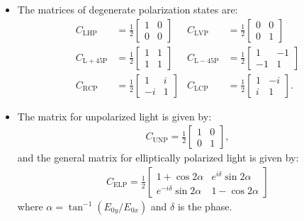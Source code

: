\documentclass[10pt]{article}
\begin{document}
\begin{itemize}
		\item The matrices of degenerate polarization states are:
		\begin{align*}
			C_{\mathrm{LHP}} &= \frac{1}{2} \begin{bmatrix}
				1 & 0 \\ 0 & 0
			\end{bmatrix} &
			C_{\mathrm{LVP}} &= \frac{1}{2} \begin{bmatrix}
				0 & 0 \\ 0 & 1
			\end{bmatrix} \\
			C_{\mathrm{L+45P}} &= \frac{1}{2} \begin{bmatrix}
				1 & 1 \\ 1 & 1
			\end{bmatrix} &
			C_{\mathrm{L-45P}} &= \frac{1}{2} \begin{bmatrix}
				1 & -1 \\ -1 & 1
			\end{bmatrix} \\
			C_{\mathrm{RCP}} &= \frac{1}{2} \begin{bmatrix}
				1 & i \\ -i & 1
			\end{bmatrix} &
			C_{\mathrm{LCP}} &= \frac{1}{2} \begin{bmatrix}
				1 & -i \\ i & 1
			\end{bmatrix}.
		\end{align*}

		\item The matrix for unpolarized light is given by:
		\begin{align*}
			C_{\mathrm{UNP}} = \frac{1}{2} \begin{bmatrix}
				1 & 0 \\ 0 & 1
			\end{bmatrix},
		\end{align*}
		and the general matrix for elliptically polarized light is given by:
		\begin{align*}
			C_{\mathrm{ELP}} = \frac{1}{2} \begin{bmatrix}
				1 + \cos 2\alpha & e^{i\delta} \sin 2\alpha \\
				e^{-i\delta} \sin 2\alpha & 1 - \cos 2\alpha
			\end{bmatrix}
		\end{align*}
		where $\alpha = \tan^{-1} (E_{0y}/E_{0x})$ and $\delta$ is the phase.
	\end{itemize}	

	
	  
\end{document}
